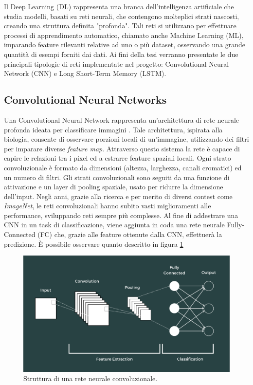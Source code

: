 \documentclass[11pt]{report}
\begin{document}
Il Deep Learning (DL) rappresenta una branca dell'intelligenza artificiale che studia modelli, basati su reti neurali, che contengono molteplici strati nascosti, creando una struttura definita "profonda". Tali reti si utilizzano per effettuare processi di apprendimento automatico, chiamato anche Machine Learning (ML), imparando feature rilevanti relative ad uno o più dataset, osservando una grande quantità di esempi forniti dai dati. Ai fini della tesi verranno presentate le due principali tipologie di reti implementate nel progetto: Convolutional Neural Network (CNN) e Long Short-Term Memory (LSTM).


\subsection{Convolutional Neural Networks}
Una Convolutional Neural Network rappresenta un'architettura di rete neurale profonda ideata per classificare immagini \cite{krizhevsky2012imagenet}. Tale architettura, ispirata alla biologia, consente di osservare porzioni locali di un'immagine, utilizzando dei filtri per imparare diverse \textit{feature map}. Attraverso questo sistema la rete è capace di capire le relazioni tra i pixel ed a estrarre feature spaziali locali. Ogni strato convoluzionale è formato da dimensioni (altezza, larghezza, canali cromatici) ed un numero di filtri. Gli strati convoluzionali sono seguiti da una funzione di attivazione e un layer di pooling spaziale, usato per ridurre la dimensione dell'input. Negli anni, grazie alla ricerca e per merito di diversi contest come \textit{ImageNet}, le reti convoluzionali hanno subito vasti miglioramenti alle performance, sviluppando reti sempre più complesse. Al fine di addestrare una CNN in un task di classificazione, viene aggiunta in coda una rete neurale Fully-Connected (FC) che, grazie alle feature ottenute dalla CNN, effettuerà la predizione.  È possibile osservare quanto descritto in figura \ref{fig:cnn}



\begin{figure}[h]
    \centering
    \includegraphics[scale = 0.3]{img/cnn.png}
    \caption[Struttura di una rete neurale convoluzionale.]{Struttura di una rete neurale convoluzionale.\footnotemark}
    \label{fig:cnn}
\end{figure}
\end{document}
